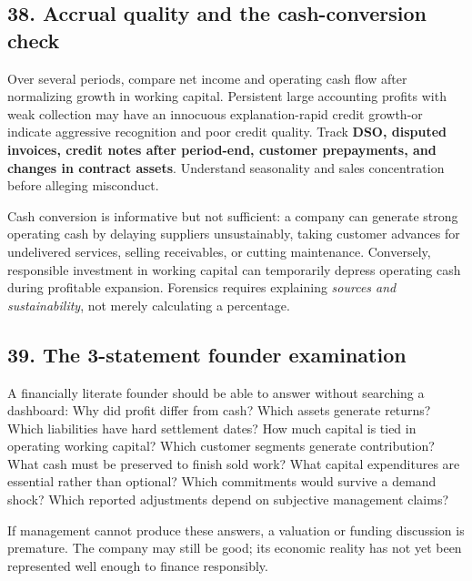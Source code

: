 \subsection{38. Accrual quality and the cash-conversion check}


Over several periods, compare net income and operating cash flow after normalizing growth in working capital. Persistent large accounting profits with weak collection may have an innocuous explanation-rapid credit growth-or indicate aggressive recognition and poor credit quality. Track \textbf{DSO, disputed invoices, credit notes after period-end, customer prepayments, and changes in contract assets}. Understand seasonality and sales concentration before alleging misconduct.

Cash conversion is informative but not sufficient: a company can generate strong operating cash by delaying suppliers unsustainably, taking customer advances for undelivered services, selling receivables, or cutting maintenance. Conversely, responsible investment in working capital can temporarily depress operating cash during profitable expansion. Forensics requires explaining \textit{sources and sustainability}, not merely calculating a percentage.

\subsection{39. The 3-statement founder examination}


A financially literate founder should be able to answer without searching a dashboard: Why did profit differ from cash? Which assets generate returns? Which liabilities have hard settlement dates? How much capital is tied in operating working capital? Which customer segments generate contribution? What cash must be preserved to finish sold work? What capital expenditures are essential rather than optional? Which commitments would survive a demand shock? Which reported adjustments depend on subjective management claims?

If management cannot produce these answers, a valuation or funding discussion is premature. The company may still be good; its economic reality has not yet been represented well enough to finance responsibly.

